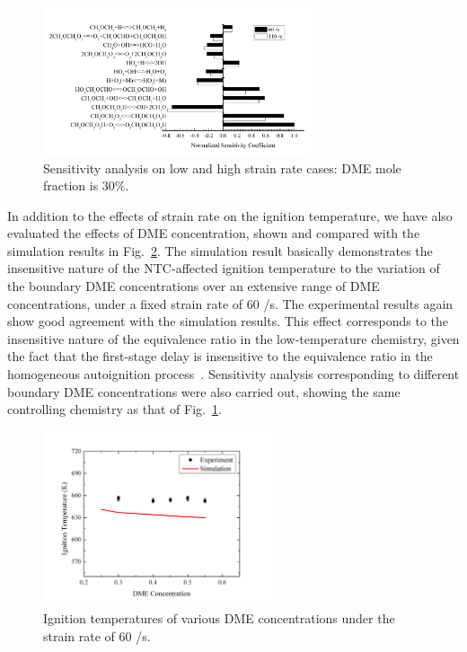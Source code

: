 \documentclass[review,3p,times]{elsarticleUS}
\begin{document}
\begin{figure}[t]
  \centering
  \scriptsize
  \vspace{-0.1in}
  \includegraphics[width=0.7\textwidth]{Sen_SR.png}
  \normalsize
  \vspace{-0.1in}
  \caption{Sensitivity analysis on low and high strain rate cases: DME mole fraction is $30\%$.}
  \label{fig:Sen_SR}
\end{figure}

In addition to the effects of strain rate on the ignition temperature, we have also evaluated the effects of DME concentration, shown and compared with the simulation results in Fig.~\ref{fig:Ign-Con}.  The simulation result basically demonstrates the insensitive nature of the NTC-affected ignition temperature to the variation of the boundary DME concentrations over an extensive range of DME concentrations, under a fixed strain rate of $60$ /s.  The experimental results again show good agreement with the simulation results.  This effect corresponds to the insensitive nature of the equivalence ratio in the low-temperature chemistry, given the fact that the first-stage delay is insensitive to the equivalence ratio in the homogeneous autoignition process~\cite{zhao13}.  Sensitivity analysis corresponding to different boundary DME concentrations were also carried out, showing the same controlling chemistry as that of Fig.~\ref{fig:Sen_SR}.

\begin{figure}[t]
  \centering
  \scriptsize
  \vspace{-0.1in}
  \includegraphics[width=0.6\textwidth]{Ign-Con.png}
  \normalsize
  \vspace{-0.1in}
  \caption{Ignition temperatures of various DME concentrations under the strain rate of $60$ /s.}
  \label{fig:Ign-Con}
\end{figure}
\end{document}
